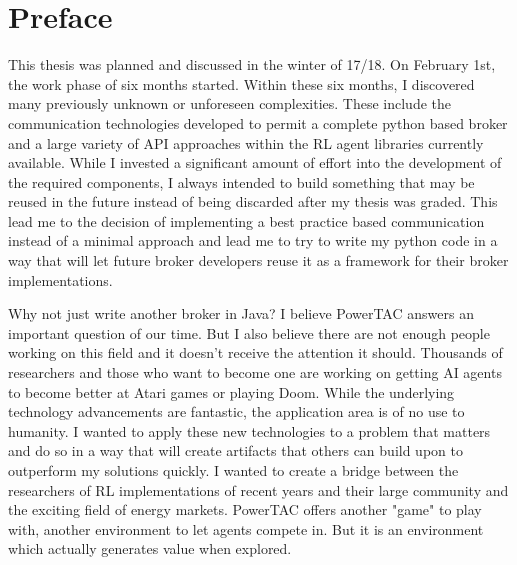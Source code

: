 \section*{Preface}

This thesis was planned and discussed in the winter of 17/18. On February 1st, the work phase of six months started.
Within these six months, I discovered many previously unknown or unforeseen complexities. These include the
communication technologies developed to permit a complete python based broker and a large variety of API approaches
within the RL agent libraries currently available. While I invested a significant amount of effort into the
development of the required components, I always intended to build something that may be reused in the future instead of
being discarded after my thesis was graded. This lead me to the decision of implementing a best practice based
communication instead of a minimal approach and lead me to try to write my python code in a way that will let
future broker developers reuse it as a framework for their broker implementations. 

Why not just write another broker in Java? I believe PowerTAC answers an important question of our time. But I also
believe there are not enough people working on this field and it doesn't receive the attention it should. Thousands of
researchers and those who want to become one are working on getting AI agents to become better at Atari games or playing
Doom. While the underlying technology advancements are fantastic, the application area is of no use to humanity. I
wanted to apply these new technologies to a problem that matters and do so in a way that will create artifacts that
others can build upon to outperform my solutions quickly. I wanted to create a bridge between the researchers of RL
implementations of recent years and their large community and the exciting field of energy markets. PowerTAC offers
another "game" to play with, another environment to let agents compete in. But it is an environment which actually
generates value when explored.

